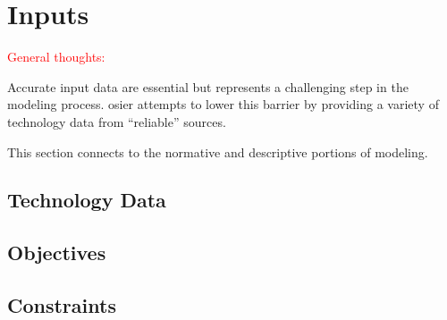 \section{Inputs}

\textcolor{red}{General thoughts:}

Accurate input data are essential but represents a challenging step in the
modeling process. \ac{osier} attempts to lower this barrier by providing a
variety of technology data from ``reliable'' sources.

This section connects to the normative and descriptive portions of modeling. 

\subsection{Technology Data}

\subsection{Objectives}

\subsection{Constraints}